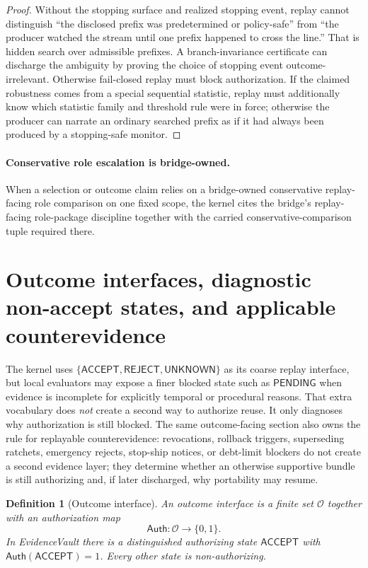 \documentclass[11pt]{article}
\newtheorem{definition}{Definition}
\theoremstyle{remark}
\newcommand{\Acc}{\mathsf{ACCEPT}}
\newcommand{\Rej}{\mathsf{REJECT}}
\newcommand{\Unk}{\mathsf{UNKNOWN}}
\newcommand{\Pend}{\mathsf{PENDING}}
\newcommand{\Auth}{\mathsf{Auth}}
\begin{document}
\begin{proof}
Without the stopping surface and realized stopping event, replay cannot distinguish
``the disclosed prefix was predetermined or policy-safe'' from ``the producer watched the stream until one prefix happened to cross the line.''
That is hidden search over admissible prefixes.
A branch-invariance certificate can discharge the ambiguity by proving the choice of stopping event outcome-irrelevant.
Otherwise fail-closed replay must block authorization.
If the claimed robustness comes from a special sequential statistic, replay must additionally know which statistic family and threshold rule were in force;
otherwise the producer can narrate an ordinary searched prefix as if it had always been produced by a stopping-safe monitor.
\end{proof}

\paragraph{Conservative role escalation is bridge-owned.}
When a selection or outcome claim relies on a bridge-owned conservative replay-facing role comparison on one fixed scope, the kernel cites the bridge's replay-facing role-package discipline together with the carried conservative-comparison tuple required there.

\section{Outcome interfaces, diagnostic non-accept states, and applicable counterevidence}
The kernel uses $\{\Acc,\Rej,\Unk\}$ as its coarse replay interface, but local evaluators may expose a finer blocked state such as $\Pend$ when evidence is incomplete for explicitly temporal or procedural reasons.
That extra vocabulary does \emph{not} create a second way to authorize reuse.
It only diagnoses why authorization is still blocked.
The same outcome-facing section also owns the rule for replayable counterevidence:
revocations, rollback triggers, superseding ratchets, emergency rejects, stop-ship notices, or debt-limit blockers do not create a second evidence layer; they determine whether an otherwise supportive bundle is still authorizing and, if later discharged, why portability may resume.

\begin{definition}[Outcome interface]
An \emph{outcome interface} is a finite set $\mathcal{O}$ together with an authorization map
\[
\Auth : \mathcal{O}\to\{0,1\}.
\]
In EvidenceVault there is a distinguished authorizing state $\Acc$ with $\Auth(\Acc)=1$.
Every other state is non-authorizing.
\end{definition}
\end{document}
